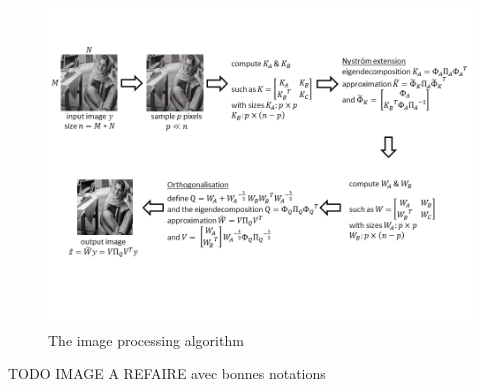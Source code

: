 \begin{figure}[H]
    \centering
    \includegraphics[width=1.2\textwidth]{img/processingChain.png}
    \caption{The image processing algorithm}
\end{figure}
TODO IMAGE A REFAIRE avec bonnes notations

